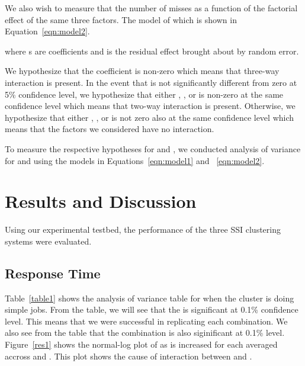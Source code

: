\documentclass[preprint]{acm_proc_article-sp}
\begin{document}
We also wish to measure that the number of misses  as a function of the factorial effect of the same three factors. The model of which is shown in Equation~\ref{eqn:model2}.



where s are coefficients and  is the residual effect brought about by random error.

We hypothesize that the coefficient  is non-zero which means that three-way interaction is present. In the event that  is not significantly different from zero at 5\% confidence level, we hypothesize that either , , or  is non-zero at the same confidence level which means that two-way interaction is present. Otherwise, we hypothesize that either , , or  is not zero also at the same confidence level which means that the factors we considered have no interaction.

To measure the respective hypotheses for  and , we conducted analysis of variance for  and  using the models in Equations~\ref{eqn:model1} and ~\ref{eqn:model2}.

\section{Results and Discussion}
Using our experimental testbed, the performance of the three SSI clustering systems were evaluated.

\subsection{Response Time}
Table~\ref{table1} shows the analysis of variance table for  when the cluster is doing simple jobs. From the table, we will see that the  is significant at 0.1\% confidence level. This means that we were successful in replicating each  combination. We also see from the table that the combination  is also siginificant at 0.1\% level. Figure~\ref{res1} shows the normal-log plot of  as  is increased for each  averaged accross  and . This plot shows the cause of interaction between  and .
\end{document}
